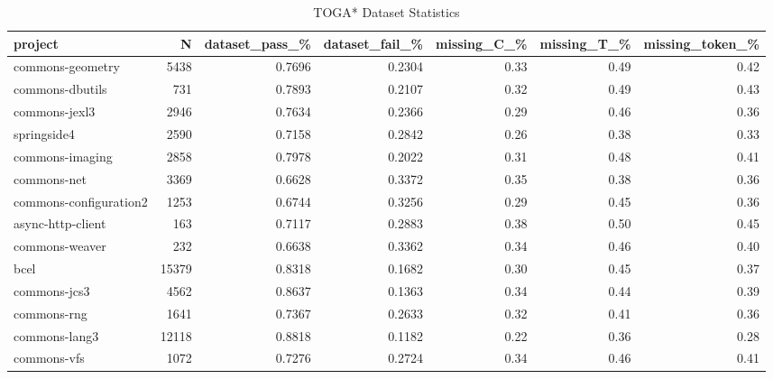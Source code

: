 \begin{table}
\centering
\caption{TOGA* Dataset Statistics}
\label{tab:toga_stats_all}
\begin{tabular}{lrrrrrr}
\toprule
                project &       N &  dataset\_pass\_\% &  dataset\_fail\_\% &  missing\_C\_\% &  missing\_T\_\% &  missing\_token\_\% \\
\midrule
       commons-geometry &    5438 &          0.7696 &          0.2304 &         0.33 &         0.49 &             0.42 \\
        commons-dbutils &     731 &          0.7893 &          0.2107 &         0.32 &         0.49 &             0.43 \\
          commons-jexl3 &    2946 &          0.7634 &          0.2366 &         0.29 &         0.46 &             0.36 \\
            springside4 &    2590 &          0.7158 &          0.2842 &         0.26 &         0.38 &             0.33 \\
        commons-imaging &    2858 &          0.7978 &          0.2022 &         0.31 &         0.48 &             0.41 \\
            commons-net &    3369 &          0.6628 &          0.3372 &         0.35 &         0.38 &             0.36 \\
 commons-configuration2 &    1253 &          0.6744 &          0.3256 &         0.29 &         0.45 &             0.36 \\
      async-http-client &     163 &          0.7117 &          0.2883 &         0.38 &         0.50 &             0.45 \\
         commons-weaver &     232 &          0.6638 &          0.3362 &         0.34 &         0.46 &             0.40 \\
                   bcel &   15379 &          0.8318 &          0.1682 &         0.30 &         0.45 &             0.37 \\
           commons-jcs3 &    4562 &          0.8637 &          0.1363 &         0.34 &         0.44 &             0.39 \\
            commons-rng &    1641 &          0.7367 &          0.2633 &         0.32 &         0.41 &             0.36 \\
          commons-lang3 &   12118 &          0.8818 &          0.1182 &         0.22 &         0.36 &             0.28 \\
            commons-vfs &    1072 &          0.7276 &          0.2724 &         0.34 &         0.46 &             0.41 \\

\end{tabular}
\end{table}
